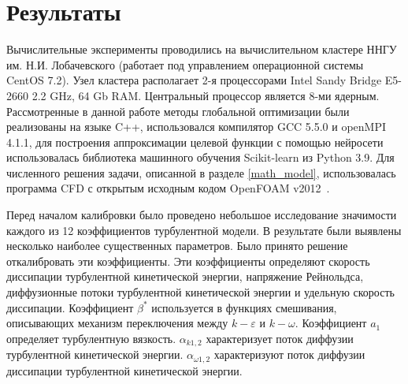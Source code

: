 \documentclass[mathematics,article,accept,pdftex,moreauthors]{Definitions/mdpi}
\begin{document}
\section{Результаты}\label{sec5}





Вычислительные эксперименты проводились на вычислительном кластере ННГУ им. Н.И. Лобачевского (работает под управлением операционной системы CentOS 7.2). Узел кластера располагает 2-я процессорами Intel Sandy Bridge E5-2660 2.2 GHz, 64 Gb RAM. Центральный процессор является 8-ми ядерным. Рассмотренные в данной работе методы глобальной оптимизации были реализованы на языке C++, использовался компилятор GCC 5.5.0 и openMPI 4.1.1, для построения аппроксимации целевой функции с помощью нейросети использовалась библиотека машинного обучения Scikit-learn из Python 3.9. Для численного решения задачи, описанной в разделе \ref{math_model}, использовалась программа CFD с открытым исходным кодом OpenFOAM v2012~\cite{OpenFOAM}.


Перед началом калибровки было проведено небольшое исследование значимости каждого из 12 коэффициентов турбулентной модели. В результате были выявлены несколько наиболее существенных параметров. Было принято решение откалибровать эти коэффициенты. Эти коэффициенты определяют скорость диссипации турбулентной кинетической энергии, напряжение Рейнольдса, диффузионные потоки турбулентной кинетической энергии и удельную скорость диссипации. Коэффициент $\beta^*$ используется в функциях смешивания, описывающих механизм переключения между $k-\varepsilon$ и $k-\omega$. Коэффициент $a_1$ определяет турбулентную вязкость. $\alpha_{k 1,2}$ характеризует поток диффузии турбулентной кинетической энергии. $\alpha_{\omega 1,2}$ характеризуют поток диффузии диссипации турбулентной кинетической энергии.
\end{document}
